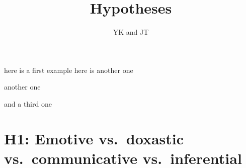 \documentclass[11pt,fleqn]{article}
\title{Hypotheses}
\author{YK and JT}
\newcommand{\6}{\mbox{$[\hspace*{-.6mm}[$}}
\newcommand{\9}{\mbox{$]\hspace*{-.6mm}]$}}
\begin{document}
\maketitle

\citealt{kiparsky-kiparsky70}

\begin{exe}
\ex here is a first example
\ex here is another one
\begin{xlist}
\ex another
\ex one
\end{xlist}
\ex and a third one
\end{exe}

\section{H1: Emotive vs.\ doxastic vs.\ communicative vs.\ inferential}
\end{document}
